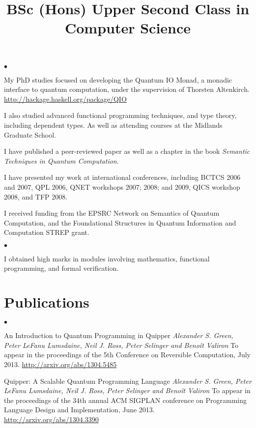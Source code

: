 \documentclass[line]{res}
\newenvironment{list2}{
  \begin{list}{$\bullet$}{%
      \setlength{\itemsep}{0in}
      \setlength{\parsep}{0.045in} \setlength{\parskip}{0in}
      \setlength{\topsep}{0in} \setlength{\partopsep}{0in}
      \setlength{\leftmargin}{0.2in}}}{\end{list}}
\begin{document}
\begin{resume}
\begin{position}
\begin{list2}
\item My PhD studies focused on developing the Quantum IO Monad, a
  monadic interface to quantum computation, under the supervision of
  Thorsten Altenkirch. 
\url{http://hackage.haskell.org/package/QIO}
\item I also studied advanced functional programming techniques, and
  type theory, including dependent types. As well as attending courses
  at the Midlands Graduate School.
\item I have published a peer-reviewed paper as well as a chapter in
  the book \emph{Semantic Techniques in Quantum Computation}. 
\item I have presented my work at international conferences, including
  BCTCS 2006 and 2007, QPL 2006, QNET workshops 2007; 2008; and 2009,
  QICS workshop 2008, and TFP 2008.
\item I received funding from the EPSRC Network on Semantics of
  Quantum Computation, and the Foundational Structures in Quantum
  Information and Computation STREP grant. 
\end{list2}
\end{position}

\vspace{-2mm}
 \location{}
\title{\bf{BSc (Hons) Upper Second Class in Computer Science}}
\begin{position}
\vspace{-4mm}
\begin{list2}
\item I obtained high marks in modules involving mathematics,
  functional programming, and formal verification. 
\end{list2}
\end{position}

\vspace{-4mm}
\section{\sc Publications}
\begin{list2}
\item An Introduction to Quantum Programming in Quipper
\emph{Alexander S. Green, Peter LeFanu Lumsdaine, Neil J. Ross, 
 Peter Selinger and Beno\^{i}t Valiron}
To appear in the proceedings of the 5th Conference on Reversible Computation, July 2013.
\url{http://arxiv.org/abs/1304.5485}

\item Quipper: A Scalable Quantum Programming Language
\emph{Alexander S. Green, Peter LeFanu Lumsdaine, Neil J. Ross, 
 Peter Selinger and Beno\^{i}t Valiron}
To appear in the proceedings of the 34th annual ACM SIGPLAN conference on Programming Language Design and Implementation, June 2013.
\url{http://arxiv.org/abs/1304.3390}


\end{list2}
\end{resume}
\end{document}
